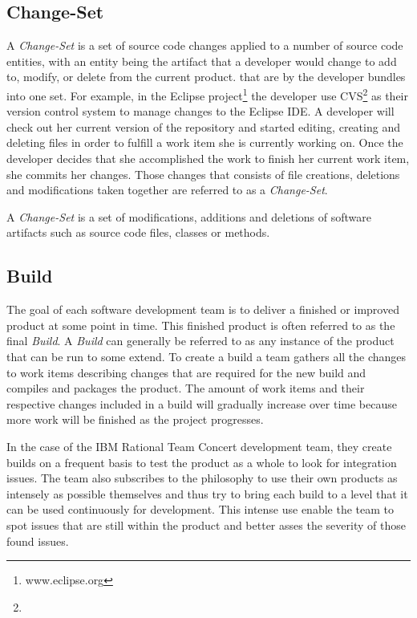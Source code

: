 \subsection{Change-Set}
A \emph{Change-Set} is a set of source code changes applied to a number of source code entities, with an entity being the artifact that a developer would change to add to, modify, or delete from the current product. that are by the developer bundles into one set.
For example, in the Eclipse project\footnote{www.eclipse.org} the developer use CVS\footnote{} as their version control system to manage changes to the Eclipse IDE.
A developer will check out her current version of the repository and started editing, creating and deleting files in order to fulfill a work item she is currently working on.
Once the developer decides that she accomplished the work to finish her current work item, she commits her changes.
Those changes that consists of file creations, deletions and modifications taken together are referred to as a \emph{Change-Set}. 

\begin{note}
\begin{mydef}
A \emph{Change-Set} is a set of modifications, additions and deletions of software artifacts such as source code files, classes or methods.
\end{mydef}
\end{note}

\subsection{Build}
The goal of each software development team is to deliver a finished or improved product at some point in time.
This finished product is often referred to as the final \emph{Build}.
A \emph{Build} can generally be referred to as any instance of the product that can be run to some extend.
To create a build a team gathers all the changes to work items describing changes that are required for the new build and compiles and packages the product.
The amount of work items and their respective changes included in a build will gradually increase over time because more work will be finished as the project progresses.

In the case of the IBM Rational Team Concert development team, they create builds on a frequent basis to test the product as a whole to look for integration issues. 
The team also subscribes to the philosophy to use their own products as intensely as possible themselves and thus try to bring each build to a level that it can be used continuously for development.
This intense use enable the team to spot issues that are still within the product and better asses the severity of those found issues.

